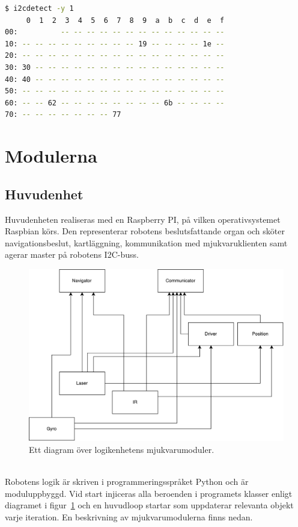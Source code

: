 \documentclass{article}
\begin{document}
\newline
\begin{lstlisting}[language=sh, label={lst:i2c_debug}, caption={Kommando och förväntad utdata för en fungerande I2C-buss}]
$ i2cdetect -y 1
     0  1  2  3  4  5  6  7  8  9  a  b  c  d  e  f
00:          -- -- -- -- -- -- -- -- -- -- -- -- --
10: -- -- -- -- -- -- -- -- -- 19 -- -- -- -- 1e --
20: -- -- -- -- -- -- -- -- -- -- -- -- -- -- -- --
30: 30 -- -- -- -- -- -- -- -- -- -- -- -- -- -- --
40: 40 -- -- -- -- -- -- -- -- -- -- -- -- -- -- --
50: -- -- -- -- -- -- -- -- -- -- -- -- -- -- -- --
60: -- -- 62 -- -- -- -- -- -- -- -- 6b -- -- -- --
70: -- -- -- -- -- -- -- 77
\end{lstlisting}

\clearpage
\section{Modulerna}

\subsection{Huvudenhet}
Huvudenheten realiseras med en Raspberry PI, på vilken operativsystemet Raspbian körs. Den representerar robotens beslutsfattande organ och sköter navigationsbeslut, kartläggning, kommunikation med mjukvaruklienten samt agerar master på robotens I2C-buss.

\begin{figure}[H]
\centering
\includegraphics[scale=0.45]{mjukvarumoduler}
\caption{Ett diagram över logikenhetens mjukvarumoduler.}
\label{fig:mjukvarumoduler}
\end{figure}
\ \\
 Robotens logik är skriven i programmeringsspråket Python och är moduluppbyggd. Vid start injiceras alla beroenden i programets klasser enligt diagramet i figur~\ref{fig:mjukvarumoduler} och en huvudloop startar som uppdaterar relevanta objekt varje iteration. En beskrivning av mjukvarumodulerna finns nedan.
\end{document}
